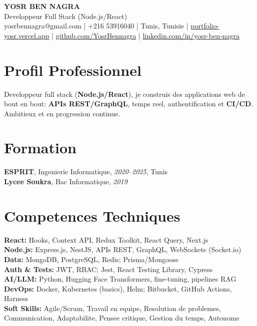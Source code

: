 \documentclass[10pt,a4paper]{article}
\begin{document}
\begin{center}
  {\Large\bfseries YOSR BEN NAGRA}\\[2pt]
  {\small Developpeur Full Stack (Node.js/React)}\\[3pt]
  {\footnotesize yosrbennagra@gmail.com \;|\; +216 53916040 \;|\; Tunis, Tunisie \;|\; \href{https://portfolio-yosr.vercel.app/en}{portfolio-yosr.vercel.app} \;|\; \href{https://github.com/YosrBennagra}{github.com/YosrBennagra} \;|\; \href{https://www.linkedin.com/in/yosr-ben-nagra/}{linkedin.com/in/yosr-ben-nagra}}
\end{center}

\section*{Profil Professionnel}
{\small
Developpeur full stack (\textbf{Node.js/React}), je construis des applications web de bout en bout: \textbf{APIs REST/GraphQL}, temps reel, authentification et \textbf{CI/CD}. Ambitieux et en progression continue.
}

\vspace{4pt}

\section*{Formation}
{\small
\textbf{ESPRIT}, Ingenierie Informatique, \textit{2020--2025}, Tunis\\[1pt]
\textbf{Lycee Soukra}, Bac Informatique, \textit{2019}
}

\vspace{4pt}

\section*{Competences Techniques}
{\small
\textbf{React:} Hooks, Context API, Redux Toolkit, React Query, Next.js\\[2pt]
\textbf{Node.js:} Express.js, NestJS, APIs REST, GraphQL, WebSockets (Socket.io)\\[2pt]
\textbf{Data:} MongoDB, PostgreSQL, Redis; Prisma/Mongoose\\[2pt]
\textbf{Auth \& Tests:} JWT, RBAC; Jest, React Testing Library, Cypress\\[2pt]
\textbf{AI/LLM:} Python, Hugging Face Transformers, fine-tuning, pipelines RAG\\[2pt]
\textbf{DevOps:} Docker, Kubernetes (basics), Helm; Bitbucket, GitHub Actions, Harness\\[2pt]
\textbf{Soft Skills:} Agile/Scrum, Travail en equipe, Resolution de problemes, Communication, Adaptabilite, Pensee critique, Gestion du temps, Autonome
}
\end{document}
